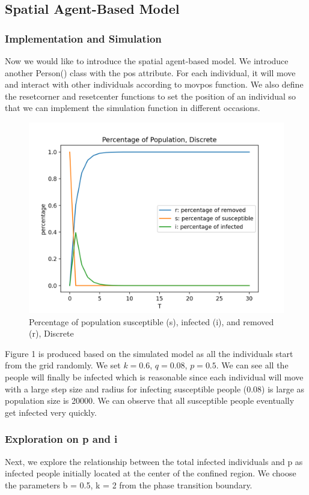 \documentclass{article}
\begin{document}
\subsection{Spatial Agent-Based Model}

\subsubsection{Implementation and Simulation}


Now we would like to introduce the spatial agent-based model. We introduce another Person() class with the pos attribute. For each individual, it will move and interact with other individuals according to movpos function. We also define the resetcorner and resetcenter functions to set the position of an individual so that we can implement the simulation function in different occasions.


\begin{figure}[htp]

\centering
\includegraphics[width=.3\textwidth]{spatialagentsimulation.png}
\caption{Percentage of population susceptible (s), infected (i), and removed (r), Discrete}
\label{fig:figure1}
\end{figure}

Figure 1 is produced based on the simulated model as all the individuals start from the grid randomly. We set $k = 0.6$, $q = 0.08$, $p = 0.5$. We can see all the people will finally be infected which is reasonable since each individual will move with a large step size and radius for infecting susceptible people (0.08) is large as population size is 20000. We can observe that all susceptible people eventually get infected very quickly.



\subsubsection{Exploration on p and i}
Next, we explore the relationship between the total infected individuals and p as infected people initially located at the center of the confined region. We choose the parameters b = 0.5, k = 2 from the phase transition boundary.
\end{document}
